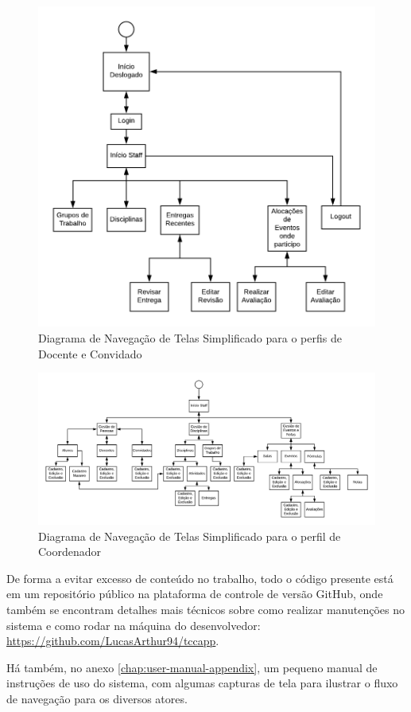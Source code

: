 \begin{figure}[H]
    \centering
    \includegraphics[scale=1]{imagens/telas_staff.png}
    \caption{Diagrama de Navegação de Telas Simplificado para o perfis de Docente e Convidado}
    \label{fig:telas-staff}
\end{figure}

\begin{figure}[H]
    \centering
    \includegraphics[angle=90, origin=c,scale=0.7]{imagens/telas_coordenador.png}
    \caption{Diagrama de Navegação de Telas Simplificado para o perfil de Coordenador}
    \label{fig:telas-coordenador}
\end{figure}

De forma a evitar excesso de conteúdo no trabalho, todo o código presente está em um repositório público na plataforma de controle de versão GitHub, onde também se encontram detalhes mais técnicos sobre como realizar manutenções no sistema e como rodar na máquina do desenvolvedor: \href{https://github.com/LucasArthur94/tccapp}{https://github.com/LucasArthur94/tccapp}.

Há também, no anexo \ref{chap:user-manual-appendix}, um pequeno manual de instruções de uso do sistema, com algumas capturas de tela para ilustrar o fluxo de navegação para os diversos atores.